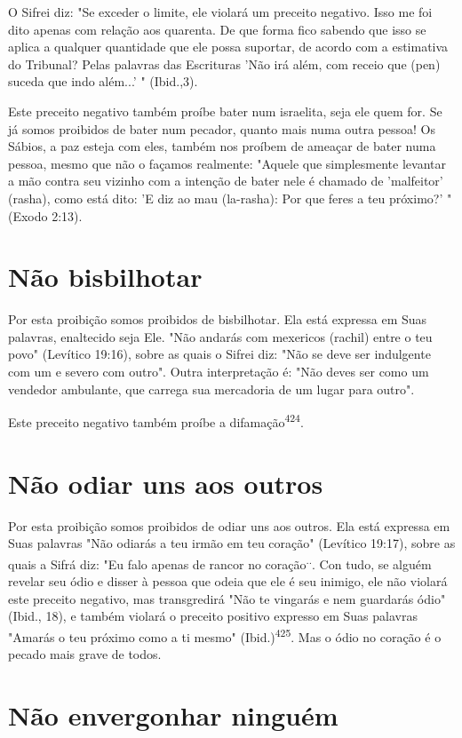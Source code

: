 \begin{itemize}
\begin{enumrate}
\begin{itemize}
\begin{itemize}
\begin{itemize}
O Sifrei diz: "Se exceder o limite, ele violará um preceito negativo.
Isso me foi dito apenas com relação aos quarenta. De que forma fico
sabendo que isso se aplica a qualquer quantidade que ele possa suportar,
de acordo com a estimativa do Tribunal? Pelas palavras das Escrituras
'Não irá além, com re­ceio que (pen) suceda que indo além...' "
(Ibid.,3).

Este preceito negativo também proíbe bater num israelita, seja ele quem
for. Se já somos proibidos de bater num pecador, quanto mais numa ou­tra
pessoa! Os Sábios, a paz esteja com eles, também nos proíbem de ameaçar
de bater numa pessoa, mesmo que não o façamos realmente: "Aquele que
sim­plesmente levantar a mão contra seu vizinho com a intenção de bater
nele é chamado de 'malfeitor' (rasha), como está dito: 'E diz ao mau
(la-rasha): Por que feres a teu próximo?' " (Exodo 2:13).

\section{Não bisbilhotar}

Por esta proibição somos proibidos de bisbilhotar. Ela está expressa em
Suas palavras, enaltecido seja Ele. "Não andarás com mexericos (rachil)
en­tre o teu povo" (Levítico 19:16), sobre as quais o Sifrei diz: "Não
se deve ser indulgente com um e severo com outro". Outra interpretação
é: "Não deves ser como um vendedor ambulante, que carrega sua mercadoria
de um lugar pa­ra outro".

Este preceito negativo também proíbe a difamação\textsuperscript{424}.

\section{Não odiar uns aos outros}

Por esta proibição somos proibidos de odiar uns aos outros. Ela está
expressa em Suas palavras "Não odiarás a teu irmão em teu coração"
(Levítico 19:17), sobre as quais a Sifrá diz: "Eu falo apenas de rancor
no coração\textsuperscript{..}. Con tudo, se alguém revelar seu ódio e
disser à pessoa que odeia que ele é seu inimi­go, ele não violará este
preceito negativo, mas transgredirá "Não te vingarás e nem guardarás
ódio" (Ibid., 18), e também violará o preceito positivo expres­so em
Suas palavras "Amarás o teu próximo como a ti mesmo"
(Ibid.)\textsuperscript{425}. Mas o ódio no coração é o pecado mais
grave de todos.

\section{Não envergonhar ninguém}


\end{itemize}
\end{itemize}
\end{itemize}
\end{enumrate}
\end{itemize}
